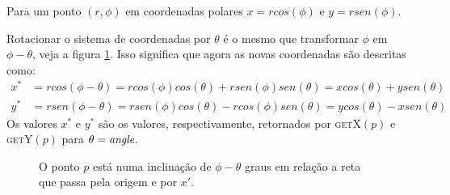 Para um ponto $(r, \phi)$ em coordenadas polares $x = rcos(\phi)$
e $y = rsen(\phi)$.

Rotacionar o sistema de coordenadas por $\theta$ é o mesmo que
transformar $\phi$ em $\phi - \theta$, veja a figura
\ref{fig:parestatico:rotacao}. Isso significa que agora as novas
coordenadas são descritas como:
\begin{align*}
    x^* & = rcos(\phi - \theta) = rcos(\phi)cos(\theta)
    + rsen(\phi)sen(\theta) = xcos(\theta) + ysen(\theta) \\
    y^* & = rsen(\phi - \theta) = rsen(\phi)cos(\theta)
    - rcos(\phi)sen(\theta) = ycos(\theta) - xsen(\theta)
\end{align*}
Os valores $x^*$ e $y^*$ são os valores, respectivamente,
retornados por \textsc{getX}$(p)$ e \textsc{getY}$(p)$ para
$\theta = \textit{angle}$.

\begin{figure}
    \centering
    \caption{O ponto $p$ está numa inclinação de $\phi - \theta$ graus
    em relação a reta que passa pela origem e por $x'$.}
    \label{fig:parestatico:rotacao}
\end{figure}

